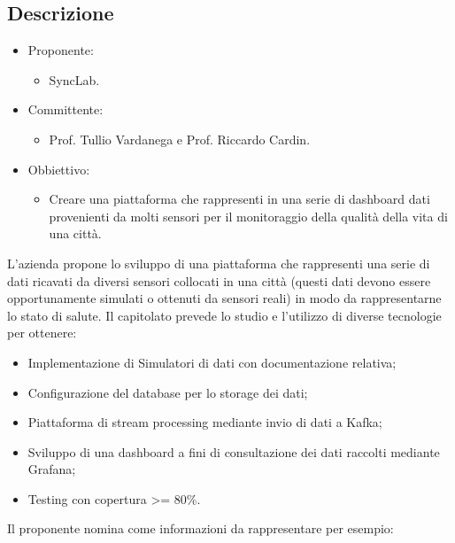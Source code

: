 \documentclass[a4paper, twoside]{article}
\begin{document}
    \subsection{Descrizione}
        \begin{itemize}
            \item Proponente:
            \begin{itemize}
                \item SyncLab.
            \end{itemize}
            \item Committente:
            \begin{itemize}
                \item Prof. Tullio Vardanega e Prof.
                Riccardo Cardin.
            \end{itemize}
            \item Obbiettivo:
            \begin{itemize}
                \item Creare una piattaforma che rappresenti in una serie di
                dashboard dati provenienti da molti sensori per il monitoraggio
                della qualità della vita di una città.
            \end{itemize}
        \end{itemize}
        L'azienda propone lo sviluppo di una piattaforma che rappresenti una serie
        di dati ricavati da diversi sensori collocati in una città (questi dati devono
        essere opportunamente simulati o ottenuti da sensori reali) in modo da rappresentarne
        lo stato di salute. Il capitolato prevede lo studio e l'utilizzo di
        diverse tecnologie per ottenere:
        \begin{itemize}
            \item Implementazione di Simulatori di dati con documentazione
            relativa;
            \item Configurazione del database per lo storage dei dati;
            \item Piattaforma di stream processing mediante invio di dati a
            Kafka;
            \item Sviluppo di una dashboard a fini di consultazione dei dati
            raccolti mediante Grafana;
            \item Testing con copertura >= 80\%.
        \end{itemize}
        Il proponente nomina come informazioni da rappresentare
        per esempio:
\end{document}
